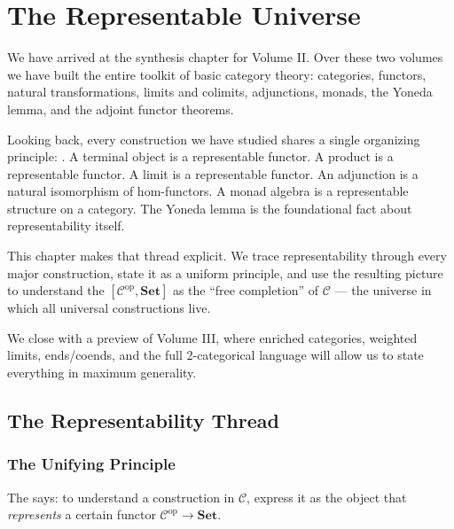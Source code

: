 
\chapter{The Representable Universe}

\begin{overviewbox}
We have arrived at the synthesis chapter for Volume II. Over these two
volumes we have built the entire toolkit of basic category theory:
categories, functors, natural transformations, limits and colimits,
adjunctions, monads, the Yoneda lemma, and the adjoint functor theorems.

Looking back, every construction we have studied shares a single organizing
principle: . A terminal object is a representable
functor. A product is a representable functor. A limit is a representable
functor. An adjunction is a natural isomorphism of hom-functors. A monad
algebra is a representable structure on a category. The Yoneda lemma is
the foundational fact about representability itself.

This chapter makes that thread explicit. We trace representability through
every major construction, state it as a uniform principle, and use the
resulting picture to understand the 
$[\mathcal{C}^{\mathrm{op}}, \mathbf{Set}]$ as the ``free completion''
of $\mathcal{C}$ --- the universe in which all universal constructions live.

We close with a preview of Volume III, where enriched categories, weighted
limits, ends/coends, and the full 2-categorical language will allow us to
state everything in maximum generality.
\end{overviewbox}


\section{The Representability Thread}
\label{sec:rep-thread}

\subsection{The Unifying Principle}

The  says: to understand a construction
in $\mathcal{C}$, express it as the object that \emph{represents} a
certain functor $\mathcal{C}^{\mathrm{op}} \to \mathbf{Set}$.

